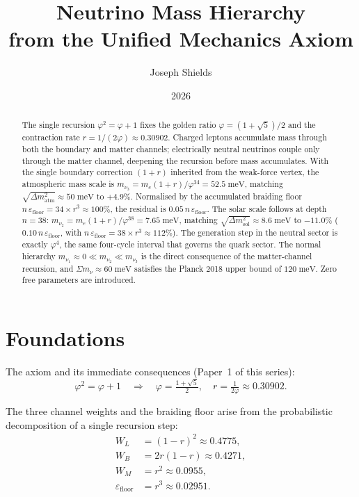 \documentclass[12pt]{article}
\title{\textbf{Neutrino Mass Hierarchy\\
from the Unified Mechanics Axiom}}
\author{Joseph Shields}
\date{2026}
\begin{document}
\maketitle

\begin{abstract}
The single recursion $\varphi^2 = \varphi + 1$ fixes the golden ratio
$\varphi = (1+\sqrt{5})/2$ and the contraction rate
$r = 1/(2\varphi) \approx 0.30902$.  Charged leptons accumulate mass
through both the boundary and matter channels; electrically neutral
neutrinos couple only through the matter channel, deepening the
recursion before mass accumulates.  With the single boundary correction
$(1{+}r)$ inherited from the weak-force vertex, the atmospheric mass
scale is $m_{\nu_3} = m_e(1{+}r)/\varphi^{34} = 52.5\;\text{meV}$,
matching $\sqrt{\Delta m^2_{\text{atm}}} \approx 50\;\text{meV}$ to
$+4.9\%$.  Normalised by the accumulated braiding floor
$n\,\varepsilon_{\text{floor}} = 34 \times r^3 \approx 100\%$, the
residual is $0.05\,n\,\varepsilon_{\text{floor}}$.  The solar scale
follows at depth $n = 38$:
$m_{\nu_2} = m_e(1{+}r)/\varphi^{38} = 7.65\;\text{meV}$,
matching $\sqrt{\Delta m^2_{\text{sol}}} \approx 8.6\;\text{meV}$
to $-11.0\%$ ($0.10\,n\,\varepsilon_{\text{floor}}$, with
$n\,\varepsilon_{\text{floor}} = 38 \times r^3 \approx 112\%$).
The generation step in the neutral sector is exactly $\varphi^4$,
the same four-cycle interval that governs the quark sector.
The normal hierarchy $m_{\nu_1} \approx 0 \ll m_{\nu_2} \ll m_{\nu_3}$
is the direct consequence of the matter-channel recursion, and
$\Sigma m_\nu \approx 60\;\text{meV}$ satisfies the Planck 2018
upper bound of $120\;\text{meV}$.  Zero free parameters are introduced.
\end{abstract}

\section{Foundations}

The axiom and its immediate consequences (Paper~1 of this series):
\begin{equation}
  \varphi^2 = \varphi + 1 \quad\Rightarrow\quad
  \varphi = \tfrac{1+\sqrt{5}}{2},\quad
  r = \tfrac{1}{2\varphi} \approx 0.30902.
  \label{eq:axiom}
\end{equation}

The three channel weights and the braiding floor arise from the
probabilistic decomposition of a single recursion step:
\begin{align}
  W_L &= (1-r)^2 \approx 0.4775, \label{eq:wl}\\
  W_B &= 2r(1-r) \approx 0.4271, \label{eq:wb}\\
  W_M &= r^2     \approx 0.0955, \label{eq:wm}\\
  \varepsilon_{\text{floor}} &= r^3 \approx 0.02951. \label{eq:eps}
\end{align}
\end{document}
